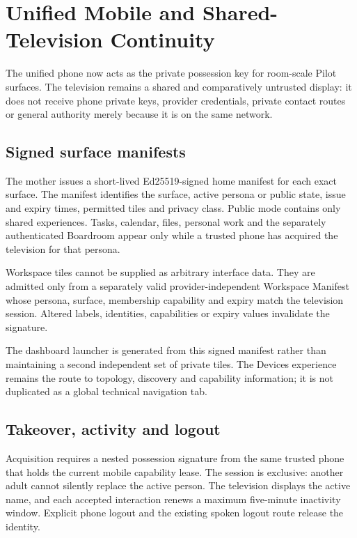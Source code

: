 \section{Unified Mobile and Shared-Television Continuity}
\label{sec:pilot-mobile-shared-tv}

The unified phone now acts as the private possession key for room-scale Pilot
surfaces.  The television remains a shared and comparatively untrusted display: it
does not receive phone private keys, provider credentials, private contact routes or
general authority merely because it is on the same network.

\subsection{Signed surface manifests}

The mother issues a short-lived Ed25519-signed home manifest for each exact surface.
The manifest identifies the surface, active persona or public state, issue and expiry
times, permitted tiles and privacy class.  Public mode contains only shared
experiences.  Tasks, calendar, files, personal work and the separately authenticated
Boardroom appear only while a trusted phone has acquired the television for that
persona.

Workspace tiles cannot be supplied as arbitrary interface data.  They are admitted
only from a separately valid provider-independent Workspace Manifest whose persona,
surface, membership capability and expiry match the television session.  Altered
labels, identities, capabilities or expiry values invalidate the signature.

The dashboard launcher is generated from this signed manifest rather than maintaining
a second independent set of private tiles.  The Devices experience remains the route
to topology, discovery and capability information; it is not duplicated as a global
technical navigation tab.

\subsection{Takeover, activity and logout}

Acquisition requires a nested possession signature from the same trusted phone that
holds the current mobile capability lease.  The session is exclusive: another adult
cannot silently replace the active person.  The television displays the active name,
and each accepted interaction renews a maximum five-minute inactivity window.
Explicit phone logout and the existing spoken logout route release the identity.

